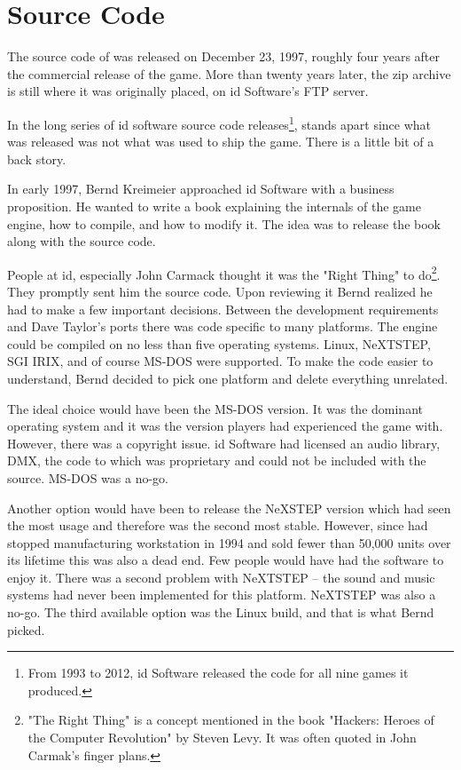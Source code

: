 \section{Source Code}
The source code of \doom{} was released on December 23, 1997, roughly four years after the commercial release of the game. More than twenty years later, the zip archive is still where it was originally placed, on id Software's FTP server.\\
\par
{}
\par
 In the long series of id software source code releases\footnote{From 1993 to 2012, id Software released the code for all nine games it produced.}, \doom{} stands apart since what was released was not what was used to ship the game. There is a little bit of a back story.\\
 \par
 In early 1997, Bernd Kreimeier approached id Software with a business proposition. He wanted to write a book explaining the internals of the game engine, how to compile, and how to modify it. The idea was to release the book along with the source code.\\
 \par
  People at id, especially John Carmack thought it was the "Right Thing" to do\footnote{"The Right Thing" is a concept mentioned in the book "Hackers: Heroes of the Computer Revolution" by Steven Levy. It was often quoted in John Carmak's finger plans.}. They promptly sent him the source code. Upon reviewing it Bernd realized he had to make a few important decisions. Between the development requirements and Dave Taylor's ports there was code specific to many platforms. The engine could be compiled on no less than five operating systems. Linux, NeXTSTEP, SGI IRIX, and of course MS-DOS were supported. To make the code easier to understand, Bernd decided to pick one platform and delete everything unrelated.\\
  \par
  The ideal choice would have been the MS-DOS version. It was the dominant operating system and it was the version players had experienced the game with. However, there was a copyright issue. id Software had licensed an audio library, DMX, the code to which was proprietary and could not be included with the source. MS-DOS was a no-go.\\
  \par
   Another option would have been to release the NeXSTEP version which had seen the most usage and therefore was the second most stable. However, since \NeXT had stopped manufacturing workstation in 1994 and sold fewer than 50,000 units over its lifetime this was also a dead end. Few people would have had the software to enjoy it. There was a second problem with NeXTSTEP -- the sound and music systems had never been implemented for this platform. NeXTSTEP was also a no-go. The third available option was the Linux build, and that is what Bernd picked.\\
